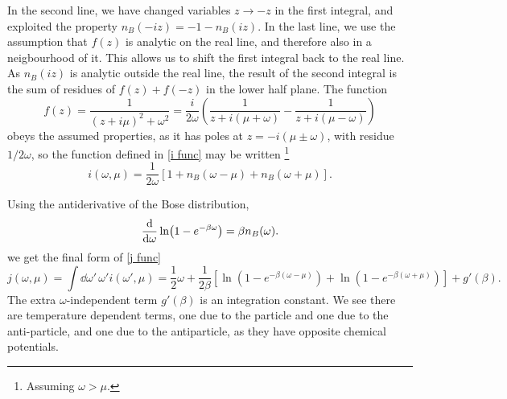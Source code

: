 In the second line, we have changed variables $z \rightarrow -z$ in the first integral, and exploited the property $n_B(-i z) = -1 - n_B(iz)$.
In the last line, we use the assumption that $f(z)$ is analytic on the real line, and therefore also in a neigbourhood of it. 
This allows us to shift the first integral back to the real line.
As $n_B(iz)$ is analytic outside the real line, the result of the second integral is the sum of residues of $f(z) + f(-z)$ in the lower half plane.
The function
\begin{equation}
    f(z) = \frac{1}{(z + i \mu)^2 + \omega^2} 
    = \frac{i}{2 \omega } 
    \left(
        \frac{1}{z + i(\mu + \omega)} - \frac{1}{z + i(\mu - \omega)}
    \right)
\end{equation}
obeys the assumed properties, as it has poles at
$z = - i (\mu \pm \omega)$, with residue $1 / 2 \omega$, so the function defined in \autoref{i func} may be written \footnote{Assuming $\omega>\mu$.}
\begin{equation}
    i(\omega, \mu) 
    = \frac{1}{2\omega}
    [1 + n_B(\omega - \mu) + n_B(\omega + \mu)].
\end{equation}


Using the antiderivative of the Bose distribution,
\begin{equation}
    \dv{\omega} \ln(1 - e^{-\beta \omega}) = \beta n_B(\omega).
\end{equation}
we get the final form of \autoref{j func}
\begin{equation}
    j(\omega, \mu) = \int \dd \omega'\, \omega' i(\omega', \mu)
    =  
    \frac{1}{2}\omega + \frac{1}{2\beta} 
    \left[
        \ln\left(1 - e^{-\beta(\omega - \mu)}\right)
        + \ln\left(1 - e^{-\beta(\omega + \mu)}\right)
    \right]
    + g'(\beta).
\end{equation}
The extra $\omega$-independent term $g'(\beta)$ is an integration constant.
We see there are temperature dependent terms, one due to the particle and one due to the anti-particle, and one due to the antiparticle, as they have opposite chemical potentials.


